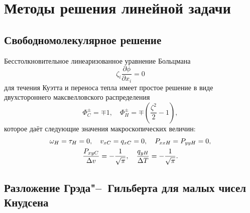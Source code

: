 \documentclass[a4paper,12pt]{article}
\newcommand{\pder}[2][]{\frac{\partial#1}{\partial#2}}
\begin{document}
\section{Методы решения линейной задачи}

\subsection{Свободномолекулярное решение}

Бесстолкновительное линеаризованное уравнение Больцмана
\begin{equation}\label{eq:linear_free}
    \zeta_i \pder[\phi]{x_i} = 0
\end{equation}
для течения Куэтта и переноса тепла имеет простое решение
в виде двухстороннего максвелловского распределения
\begin{equation}\label{eq:linear_free_solution}
    \Phi_C^\pm = \mp 1, \quad
    \Phi_H^\pm = \mp \left(\frac{\zeta^2}{2}-1\right),
\end{equation}
которое даёт следующие значения макроскопических величин:
\begin{gather}\label{eq:linear_free_macro}
    \omega_{H} = \tau_{H} = 0, \quad
    v_{xC} = q_{xC} = 0, \quad
    P_{xxH} = P_{yyH} = 0, \notag \\
    \frac{P_{xyC}}{\Delta{v}} = -\frac1{\sqrt\pi}, \quad
    \frac{q_{yH}}{\Delta{T}} = -\frac1{\sqrt\pi}.
\end{gather}

\subsection{Разложение Грэда"--~Гильберта для малых чисел Кнудсена}
\end{document}
